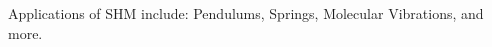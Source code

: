 \documentclass[preview]{standalone}
\begin{document}
\begin{center}
Applications of SHM include: Pendulums, Springs, Molecular Vibrations, and more.
\end{center}
\end{document}
